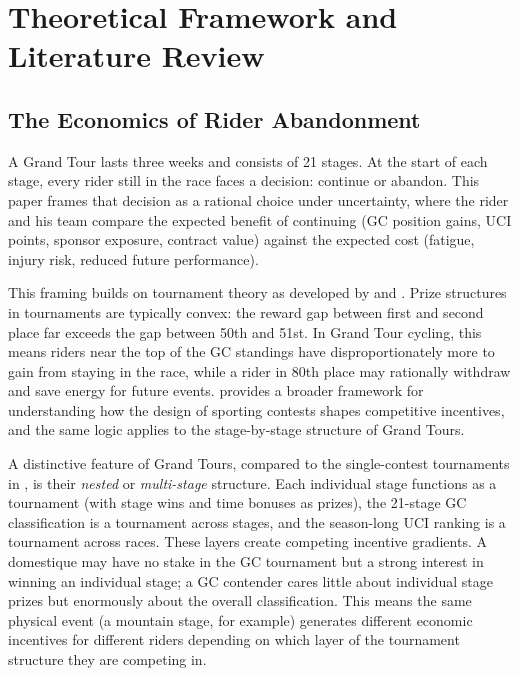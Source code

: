 \section{Theoretical Framework and Literature Review}
\label{sec:theory}

\subsection{The Economics of Rider Abandonment}

A Grand Tour lasts three weeks and consists of 21 stages. At the start of each stage, every rider still in the race faces a decision: continue or abandon. This paper frames that decision as a rational choice under uncertainty, where the rider and his team compare the expected benefit of continuing (GC position gains, UCI points, sponsor exposure, contract value) against the expected cost (fatigue, injury risk, reduced future performance).

This framing builds on tournament theory as developed by \textcite{rosen1981superstars} and \textcite{lazear1981rank}. Prize structures in tournaments are typically convex: the reward gap between first and second place far exceeds the gap between 50th and 51st. In Grand Tour cycling, this means riders near the top of the GC standings have disproportionately more to gain from staying in the race, while a rider in 80th place may rationally withdraw and save energy for future events. \textcite{szymanski2003economicdesign} provides a broader framework for understanding how the design of sporting contests shapes competitive incentives, and the same logic applies to the stage-by-stage structure of Grand Tours.

A distinctive feature of Grand Tours, compared to the single-contest tournaments in \textcite{lazear1981rank}, is their \emph{nested} or \emph{multi-stage} structure. Each individual stage functions as a tournament (with stage wins and time bonuses as prizes), the 21-stage GC classification is a tournament across stages, and the season-long UCI ranking is a tournament across races. These layers create competing incentive gradients. A domestique may have no stake in the GC tournament but a strong interest in winning an individual stage; a GC contender cares little about individual stage prizes but enormously about the overall classification. This means the same physical event (a mountain stage, for example) generates different economic incentives for different riders depending on which layer of the tournament structure they are competing in.

